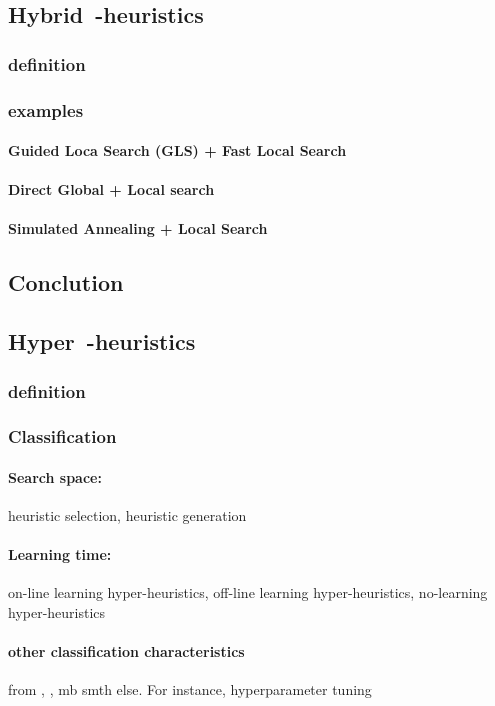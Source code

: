 \subsection{Hybrid~-heuristics}
\subsubsection{definition}
\subsubsection{examples}
\paragraph{Guided Loca Search (GLS) + Fast Local Search} \cite{tsang1997fast}
\paragraph{Direct Global + Local search} \cite{syrjakow1999efficient}
\paragraph{Simulated Annealing + Local Search} \cite{martin1996combining}
\subsection{Conclution}

\subsection{Hyper~-heuristics}
\subsubsection{definition}
\subsubsection{Classification}
\paragraph{Search space:} heuristic selection, heuristic generation
\paragraph{Learning time:} on-line learning hyper-heuristics, off-line learning hyper-heuristics, no-learning hyper-heuristics
\paragraph{other classification characteristics} from \cite{surv:kerschke2019automated}, \cite{burke2019classification}, mb smth else. For instance, hyperparameter tuning
